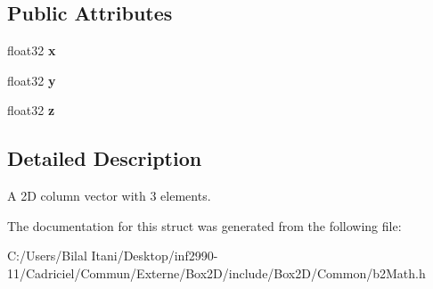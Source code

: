 \subsection*{Public Attributes}
\begin{DoxyCompactItemize}
\item 
float32 {\bfseries x}\hypertarget{structb2_vec3_aedc5e37849caa413a8e767fc47741db2}{}\label{structb2_vec3_aedc5e37849caa413a8e767fc47741db2}

\item 
float32 {\bfseries y}\hypertarget{structb2_vec3_af5a7e99d13d02ff9abb323838d44d3b1}{}\label{structb2_vec3_af5a7e99d13d02ff9abb323838d44d3b1}

\item 
float32 {\bfseries z}\hypertarget{structb2_vec3_a7cb88968ff10fa500df0b10f5c425536}{}\label{structb2_vec3_a7cb88968ff10fa500df0b10f5c425536}

\end{DoxyCompactItemize}


\subsection{Detailed Description}
A 2D column vector with 3 elements. 

The documentation for this struct was generated from the following file\+:\begin{DoxyCompactItemize}
\item 
C\+:/\+Users/\+Bilal Itani/\+Desktop/inf2990-\/11/\+Cadriciel/\+Commun/\+Externe/\+Box2\+D/include/\+Box2\+D/\+Common/b2\+Math.\+h\end{DoxyCompactItemize}
